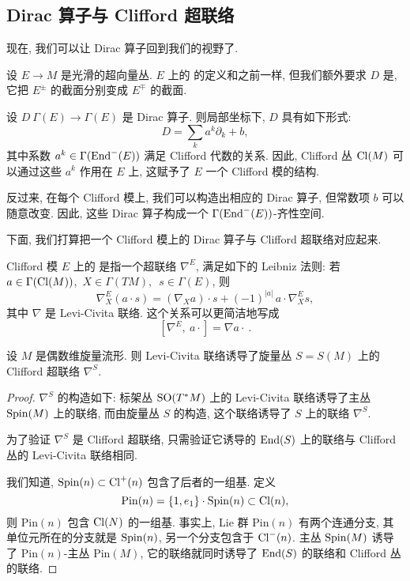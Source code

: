 \subsection{Dirac 算子与 Clifford 超联络}

现在, 我们可以让 Dirac 算子回到我们的视野了.

\begin{definition}
    设 $E \to M$ 是光滑的超向量丛. $E$ 上的 的定义和之前一样,
    但我们额外要求 $D$ 是, 它把 $E^\pm$ 的截面分别变成 $E^\mp$ 的截面.
\end{definition}

设 $D \: \Gamma (E) \to \Gamma (E)$ 是 Dirac 算子. 则局部坐标下, $D$ 具有如下形式:
\[ D = \sum_k a^k \partial_k + b, \]
其中系数 $a^k \in \Gamma (\operatorname{End}^- (E))$ 满足 Clifford 代数的关系.
因此, Clifford 丛 $\operatorname{Cl} (M)$ 可以通过这些 $a^k$ 作用在 $E$ 上,
这赋予了 $E$ 一个 Clifford 模的结构.

反过来, 在每个 Clifford 模上, 我们可以构造出相应的 Dirac 算子,
但常数项 $b$ 可以随意改变. 因此, 这些 Dirac 算子构成一个 $\Gamma (\operatorname{End}^- (E))$-齐性空间.

下面, 我们打算把一个 Clifford 模上的 Dirac 算子与 Clifford 超联络对应起来.

\begin{definition}
    Clifford 模 $E$ 上的 是指一个超联络 $\nabla^E$,
    满足如下的 Leibniz 法则: 若
    $a \in \Gamma ( \operatorname{Cl} (M) )$,\ $X \in \Gamma ( TM ),$\ $s \in \Gamma (E)$, 则
    \[ \nabla^E_X (a \cdot s) = (\nabla_X a) \cdot s + (-1)^{|a|} \, a \cdot \nabla^E_X s, \]
    其中 $\nabla$ 是 Levi-Civita 联络. 这个关系可以更简洁地写成
    \[ [ \nabla^E, \ a \cdot {} ] = \nabla a \cdot {} \ . \]
\end{definition}

\begin{proposition} \label{thm-8-nabla-s}
    设 $M$ 是偶数维旋量流形. 则 Levi-Civita 联络诱导了旋量丛
    $S = S(M)$ 上的 Clifford 超联络 $\nabla^S$.
\end{proposition}
    
\begin{proof}
    $\nabla^S$ 的构造如下: 标架丛 $\mathrm{SO} (T^* M)$ 上的 Levi-Civita
    联络诱导了主丛 $\mathrm{Spin} (M)$ 上的联络, 而由旋量丛 $S$ 的构造,
    这个联络诱导了 $S$ 上的联络 $\nabla^S$.
    
    为了验证 $\nabla^S$ 是 Clifford 超联络,
    只需验证它诱导的 $\operatorname{End} (S)$ 上的联络与 Clifford 丛的 Levi-Civita 联络相同.
    
    我们知道, $\mathrm{Spin} (n) \subset \operatorname{Cl}^+ (n)$ 包含了后者的一组基. 定义
    \[ \mathrm{Pin} (n) = \{ 1, e_1 \} \cdot \mathrm{Spin} (n) \subset \operatorname{Cl} (n), \]
    则 $\mathrm{Pin} (n)$ 包含 $\operatorname{Cl} (N)$ 的一组基.
    事实上, Lie 群 $\mathrm{Pin} (n)$ 有两个连通分支,
    其单位元所在的分支就是 $\mathrm{Spin} (n)$, 另一个分支包含于 $\operatorname{Cl}^- (n)$.
    主丛 $\mathrm{Spin} (M)$ 诱导了 $\mathrm{Pin} (n)$-主丛 $\mathrm{Pin} (M)$,
    它的联络就同时诱导了 $\operatorname{End} (S)$ 的联络和 Clifford 丛的联络.
\end{proof}

